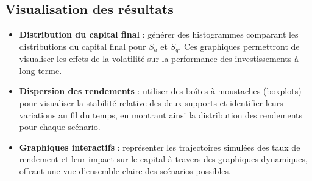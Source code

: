 \documentclass{article}
\begin{document}
\subsection{Visualisation des résultats}
\begin{itemize}
    \item \textbf{Distribution du capital final} :  
    générer des histogrammes comparant les distributions du capital final pour \( S_a \) et \( S_q \). Ces graphiques permettront de visualiser les effets de la volatilité sur la performance des investissements à long terme.  
    \item \textbf{Dispersion des rendements} :  
    utiliser des boîtes à moustaches (boxplots) pour visualiser la stabilité relative des deux supports et identifier leurs variations au fil du temps, en montrant ainsi la distribution des rendements pour chaque scénario.  
    \item \textbf{Graphiques interactifs} :  
    représenter les trajectoires simulées des taux de rendement et leur impact sur le capital à travers des graphiques dynamiques, offrant une vue d'ensemble claire des scénarios possibles.
\end{itemize}
\end{document}
